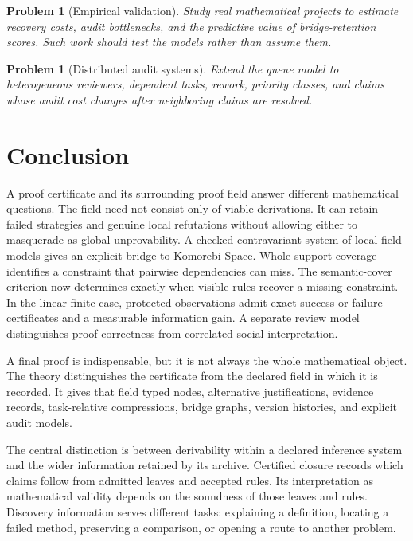 \documentclass[11pt,oneside]{article}
\theoremstyle{komorebiplain}
\theoremstyle{komorebidefinition}
\newtheorem{problem}[theorem]{Problem}
\theoremstyle{komorebiremark}
\begin{document}
\begin{problem}[Empirical validation]
\label{res:28:10}
Study real mathematical projects to estimate recovery costs, audit bottlenecks, and the predictive value of bridge-retention scores. Such work should test the models rather than assume them.
\end{problem}

\begin{problem}[Distributed audit systems]
\label{res:28:11}
Extend the queue model to heterogeneous reviewers, dependent tasks, rework, priority classes, and claims whose audit cost changes after neighboring claims are resolved.
\end{problem}


\clearpage
\section{Conclusion}
\label{sec:old29}

A proof certificate and its surrounding proof field answer different mathematical questions. The field need not consist only of viable derivations. It can retain failed strategies and genuine local refutations without allowing either to masquerade as global unprovability. A checked contravariant system of local field models gives an explicit bridge to Komorebi Space. Whole-support coverage identifies a constraint that pairwise dependencies can miss. The semantic-cover criterion now determines exactly when visible rules recover a missing constraint. In the linear finite case, protected observations admit exact success or failure certificates and a measurable information gain. A separate review model distinguishes proof correctness from correlated social interpretation.



A final proof is indispensable, but it is not always the whole mathematical object. The theory distinguishes the certificate from the declared field in which it is recorded. It gives that field typed nodes, alternative justifications, evidence records, task-relative compressions, bridge graphs, version histories, and explicit audit models.

The central distinction is between derivability within a declared inference system and the wider information retained by its archive. Certified closure records which claims follow from admitted leaves and accepted rules. Its interpretation as mathematical validity depends on the soundness of those leaves and rules. Discovery information serves different tasks: explaining a definition, locating a failed method, preserving a comparison, or opening a route to another problem.
\end{document}
